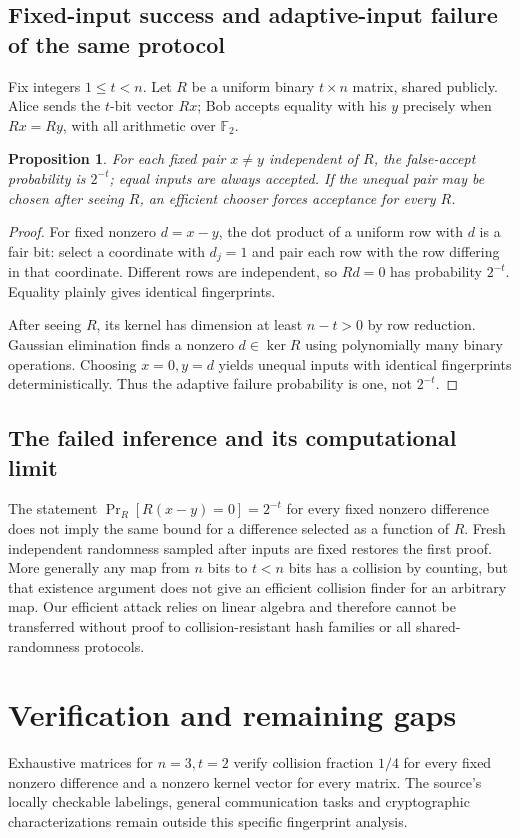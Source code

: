 \documentclass[11pt]{article}
\newtheorem{proposition}{Proposition}
\begin{document}
\subsection{Fixed-input success and adaptive-input failure of the same protocol}
Fix integers $1\le t<n$. Let $R$ be a uniform binary $t\times n$ matrix, shared publicly. Alice sends the $t$-bit vector $Rx$; Bob accepts equality with his $y$ precisely when $Rx=Ry$, with all arithmetic over $\mathbb F_2$.
\begin{proposition}
For each fixed pair $x\ne y$ independent of $R$, the false-accept probability is $2^{-t}$; equal inputs are always accepted. If the unequal pair may be chosen after seeing $R$, an efficient chooser forces acceptance for every $R$.
\end{proposition}
\begin{proof}
For fixed nonzero $d=x-y$, the dot product of a uniform row with $d$ is a fair bit: select a coordinate with $d_j=1$ and pair each row with the row differing in that coordinate. Different rows are independent, so $Rd=0$ has probability $2^{-t}$. Equality plainly gives identical fingerprints.

After seeing $R$, its kernel has dimension at least $n-t>0$ by row reduction. Gaussian elimination finds a nonzero $d\in\ker R$ using polynomially many binary operations. Choosing $x=0,y=d$ yields unequal inputs with identical fingerprints deterministically. Thus the adaptive failure probability is one, not $2^{-t}$.
\end{proof}
\subsection{The failed inference and its computational limit}
The statement $\Pr_R[R(x-y)=0]=2^{-t}$ for every fixed nonzero difference does not imply the same bound for a difference selected as a function of $R$. Fresh independent randomness sampled after inputs are fixed restores the first proof. More generally any map from $n$ bits to $t<n$ bits has a collision by counting, but that existence argument does not give an efficient collision finder for an arbitrary map. Our efficient attack relies on linear algebra and therefore cannot be transferred without proof to collision-resistant hash families or all shared-randomness protocols.
\section{Verification and remaining gaps}
Exhaustive matrices for $n=3,t=2$ verify collision fraction $1/4$ for every fixed nonzero difference and a nonzero kernel vector for every matrix. The source's locally checkable labelings, general communication tasks and cryptographic characterizations remain outside this specific fingerprint analysis.
\end{document}
